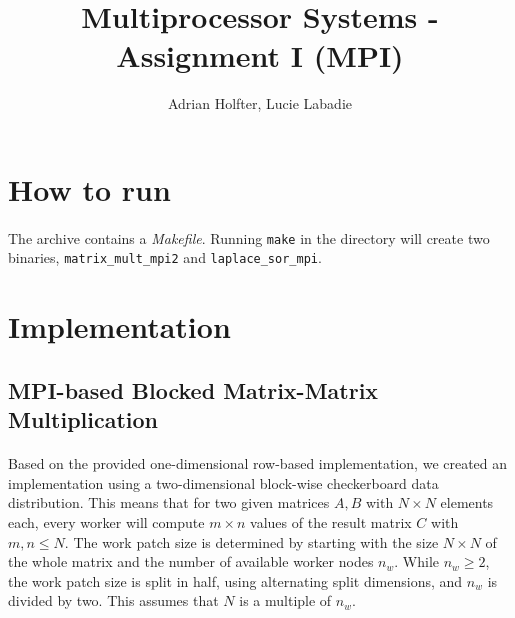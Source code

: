 \documentclass[]{article}
\title{Multiprocessor Systems - Assignment I (MPI)}
\author{Adrian Holfter, Lucie Labadie}
\begin{document}
\maketitle

\section{How to run}

\paragraph{} The archive contains a \emph{Makefile}. Running \texttt{make} in the directory will create two binaries, \texttt{matrix\_mult\_mpi2} and \texttt{laplace\_sor\_mpi}.

\section{Implementation}

\subsection{MPI-based Blocked Matrix-Matrix Multiplication}

\paragraph{} Based on the provided one-dimensional row-based implementation, we created an implementation using a two-dimensional block-wise checkerboard data distribution. This means that for two given matrices $A,B$ with $N \times N$ elements each, every worker will compute $m \times n$ values of the result matrix $C$ with $m,n \leq N$.
The work patch size is determined by starting with the size $N \times N$ of the whole matrix and the number of available worker nodes $n_w$. While $n_w \geq 2$, the work patch size is split in half, using alternating split dimensions, and $n_w$ is divided by two. This assumes that $N$ is a multiple of $n_w$.
\end{document}
